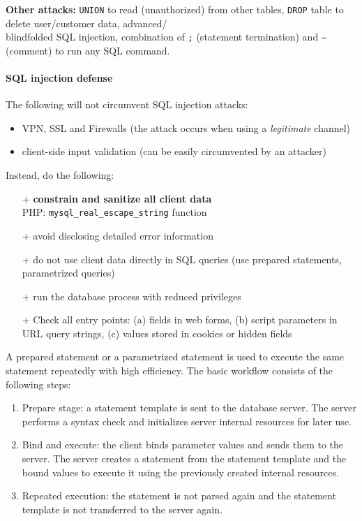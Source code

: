 \textbf{Other attacks:} {\tt UNION} to read (unauthorized) from other tables, {\tt DROP} table to delete user/customer data, advanced/\\blindfolded SQL injection, combination of {\tt ;} (statement termination) and {\tt --} (comment) to run any SQL command.

\paragraph{SQL injection defense} The following will not circumvent SQL injection attacks:
\begin{itemize}
\item VPN, SSL and Firewalls (the attack occurs when using a \emph{legitimate} channel)
\item client-side input validation (can be easily circumvented by an attacker)
\end{itemize}
Instead, do the following:
\begin{itemize}
\item[+] \textbf{constrain and sanitize all client data}
\\ \quad PHP: {\tt mysql\_real\_escape\_string} function
\item[+] avoid disclosing detailed error information
\item[+] do not use client data directly in SQL queries (use prepared statements, parametrized queries)
\item[+] run the database process with reduced privileges
\item[+] Check all entry points: (a) fields in web forms, (b) script parameters in URL query strings, (c) values stored in cookies or hidden fields
\end{itemize}

 A prepared statement or a parametrized statement is used to execute the same statement repeatedly with high efficiency. The basic workflow consists of the following steps:

\begin{enumerate}
\item Prepare stage: a statement template is sent to the database server. The server performs a syntax check and initializes server internal resources for later use.
\item Bind and execute: the client binds parameter values and sends them to the server. The server creates a statement from the statement template and the bound values to execute it using the previously created internal resources.
\item Repeated execution: the statement is not parsed again and the statement template is not transferred to the server again.
\end{enumerate}

